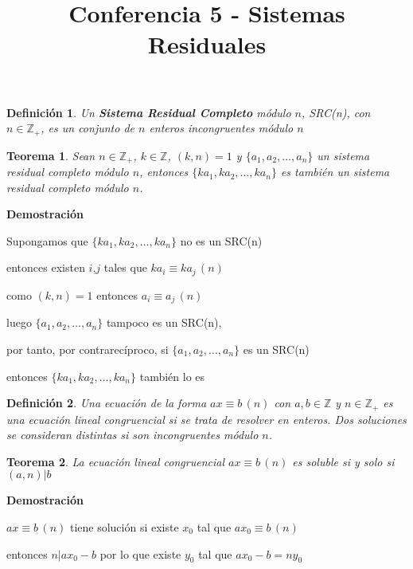\documentclass[a4paper,12pt]{report}
\title{Conferencia 5 - Sistemas Residuales}
\author{}
\newtheorem*{teo}{Teorema}
\newtheorem*{dfn}{Definición}
\begin{document}
\maketitle




\begin{dfn}
  Un \textbf{Sistema Residual Completo} módulo $n$, SRC(n), con $n\in\mathbb{Z}_+$, es un conjunto de $n$ enteros incongruentes módulo $n$
\end{dfn}



\begin{teo}
 Sean $n\in\mathbb{Z}_+$, $k\in\mathbb{Z}$, $(k,n)=1$ y $\{a_1,a_2,\dots,a_n\}$ un sistema residual completo módulo $n$, entonces $\{ka_1,ka_2,\dots,ka_n\}$ es también un sistema residual completo módulo $n$.
\end{teo}

\textbf{Demostración}

Supongamos que $\{ka_1,ka_2,\dots,ka_n\}$ no es un SRC(n)

entonces existen $i$,$j$ tales que $ka_i\equiv ka_j \, (n)$

como $(k,n)=1$ entonces $a_i\equiv a_j \, (n)$

luego $\{a_1,a_2,\dots,a_n\}$ tampoco es un SRC(n), 

por tanto, por contrarecíproco, si $\{a_1,a_2,\dots,a_n\}$ es un SRC(n) 

entonces $\{ka_1,ka_2,\dots,ka_n\}$ también lo es

\begin{dfn}
 Una ecuación de la forma $ax\equiv b \, (n)$ con $a,b\in\mathbb{Z}$ y $n\in\mathbb{Z}_+$ es una 
 ecuación lineal congruencial si se trata de resolver en enteros. Dos soluciones se consideran distintas si son incongruentes módulo $n$.
\end{dfn}

\begin{teo}
 La ecuación lineal congruencial $ax\equiv b \, (n)$ es soluble si y solo si $(a,n)|b$
\end{teo}

\textbf{Demostración}

$ax\equiv b \, (n)$ tiene solución si existe $x_0$ tal que $ax_0\equiv b \, (n)$

entonces $n|ax_0-b$ por lo que existe $y_0$ tal que $ax_0-b=ny_0$
\end{document}
